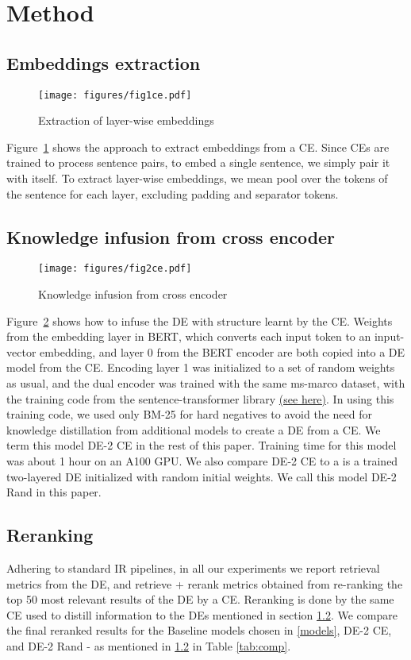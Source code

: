 \section{Method}
\subsection{Embeddings extraction}
\begin{figure}
    \centering
    \texttt{[image: figures/fig1ce.pdf]}
    \caption{Extraction of layer-wise embeddings}
    \label{fig:embedding_extraction}
\end{figure}

Figure~\ref{fig:embedding_extraction} shows the approach to extract embeddings from a CE.  Since CEs are trained to process sentence pairs, to embed a single sentence, we simply pair it with itself.  To extract layer-wise embeddings, we mean pool over the tokens of the sentence for each layer, excluding padding and separator tokens.

\subsection{Knowledge infusion from cross encoder}
\label{ce-de}
\begin{figure}
    \centering
    \texttt{[image: figures/fig2ce.pdf]}
    \caption{Knowledge infusion from cross encoder}
    \label{fig:dual_cross}
\end{figure}
Figure~\ref{fig:dual_cross} shows how to infuse the DE with structure learnt by the CE.  Weights from the embedding layer in BERT, which converts each input token to an input-vector embedding, and layer 0 from the BERT encoder are both copied into a DE model from the CE.  Encoding layer 1 was initialized to a set of random weights as usual, and the dual encoder was trained with the same ms-marco dataset,  with the training code from the sentence-transformer library \href{https://github.com/UKPLab/sentence-transformers/blob/master/examples/training/ms_marco/train_bi-encoder_mnrl.py}{(see here)}.  In using this training code, we used only BM-25 for hard negatives to avoid the need for knowledge distillation from additional models to create a DE from a CE. We term this model DE-2 CE in the rest of this paper.  Training time for this model was about 1 hour on an A100 GPU. We also compare DE-2 CE to a is a trained two-layered DE initialized with random initial weights. We call this model DE-2 Rand in this paper.

\subsection{Reranking}
\label{reranking}
Adhering to standard IR pipelines, in all our experiments we report retrieval metrics from the DE, and retrieve + rerank metrics obtained from re-ranking the top 50 most relevant results of the DE by a CE.
Reranking is done by the same CE used to distill information to the DEs mentioned in section \ref{ce-de}. We compare the final reranked results for the Baseline models chosen in \ref{models}, DE-2 CE, and  DE-2 Rand - as mentioned in \ref{ce-de} in Table \ref{tab:comp}.

